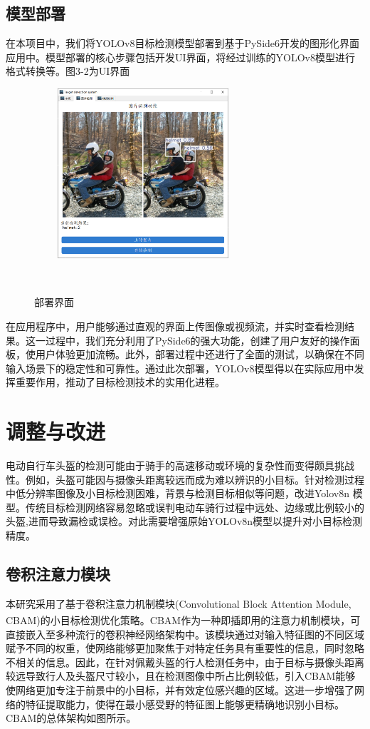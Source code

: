 \documentclass[journal]{IEEEtran}
\numberwithin{figure}{section}%
\begin{document}
\subsection{模型部署}
在本项目中，我们将YOLOv8目标检测模型部署到基于PySide6开发的图形化界面应用中。模型部署的核心步骤包括开发UI界面，将经过训练的YOLOv8模型进行格式转换等。图3-2为UI界面\par
\begin{figure}[htbp] 

   \centering
   \includegraphics[width=2.5in]{figures/部署页面.png}
   \caption{部署界面} 
   \label{fig:} 
  
\end{figure} 
在应用程序中，用户能够通过直观的界面上传图像或视频流，并实时查看检测结果。这一过程中，我们充分利用了PySide6的强大功能，创建了用户友好的操作面板，使用户体验更加流畅。此外，部署过程中还进行了全面的测试，以确保在不同输入场景下的稳定性和可靠性。通过此次部署，YOLOv8模型得以在实际应用中发挥重要作用，推动了目标检测技术的实用化进程。\par


\section{调整与改进}
电动自行车头盔的检测可能由于骑手的高速移动或环境的复杂性而变得颇具挑战性。例如，头盔可能因与摄像头距离较远而成为难以辨识的小目标。针对检测过程中低分辨率图像及小目标检测困难，背景与检测目标相似等问题，改进Yolov8n 模型。传统目标检测网络容易忽略或误判电动车骑行过程中远处、边缘或比例较小的头盔,进而导致漏检或误检。对此需要增强原始YOLOv8n模型以提升对小目标检测精度。\par
\subsection{卷积注意力模块}
本研究采用了基于卷积注意力机制模块(Convolutional Block Attention Module, CBAM)\textsuperscript{\cite{1}}的小目标检测优化策略。CBAM作为一种即插即用的注意力机制模块，可直接嵌入至多种流行的卷积神经网络架构中。该模块通过对输入特征图的不同区域赋予不同的权重，使网络能够更加聚焦于对特定任务具有重要性的信息，同时忽略不相关的信息。因此，在针对佩戴头盔的行人检测任务中，由于目标与摄像头距离较远导致行人及头盔尺寸较小，且在检测图像中所占比例较低，引入CBAM能够使网络更加专注于前景中的小目标，并有效定位感兴趣的区域。这进一步增强了网络的特征提取能力，使得在最小感受野的特征图上能够更精确地识别小目标。CBAM的总体架构如图所示。\par
\end{document}
